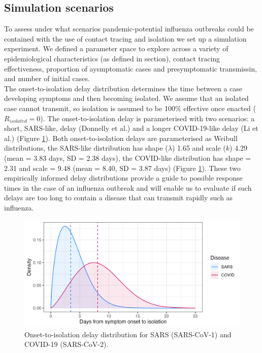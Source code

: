 \documentclass{article}
\begin{document}
\clearpage

\subsection*{Simulation scenarios}

To assess under what scenarios pandemic-potential influenza outbreaks could be contained with the use of contact tracing and isolation we set up a simulation experiment. We defined a parameter space to explore across a variety of epidemiological characteristics (as defined in  section), contact tracing effectiveness, proportion of aysmptomatic cases and presymptomatic transmissin, and number of initial cases. \\

The onset-to-isolation delay distribution determines the time between a case developing symptoms and then becoming isolated. We assume that an isolated case cannot transmit, so isolation is assumed to be 100\% effective once enacted ($R_{isolated} = 0$). The onset-to-isolation delay is parameterised with two scenarios: a short, SARS-like, delay (Donnelly et al.) and a longer COVID-19-like delay (Li et al.) (Figure \ref{fig:onset-to-isolation}). Both onset-to-isolation delays are parameterised as Weibull distributions, the SARS-like distribution has shape ($\lambda$) 1.65 and scale ($k$) 4.29 (mean = 3.83 days, SD = 2.38 days), the COVID-like distribution has shape = 2.31 and scale = 9.48 (mean = 8.40, SD = 3.87 days) (Figure \ref{fig:onset-to-isolation}). These two empirically informed delay distributions provide a guide to possible response times in the case of an influenza outbreak and will enable us to evaluate if such delays are too long to contain a disease that can transmit rapidly such as influenza. \\

\begin{figure}[ht]
\centering
\includegraphics[width=\textwidth]{../plots/onset_to_isolation.png}
\caption{Onset-to-isolation delay distribution for SARS (SARS-CoV-1) and
  COVID-19 (SARS-CoV-2).}
\label{fig:onset-to-isolation}
\end{figure}
\end{document}
